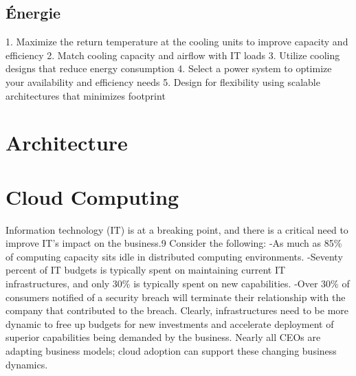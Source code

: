 \subsection{Énergie}
1. Maximize the return temperature at the cooling units to improve capacity and efficiency
2. Match cooling capacity and airflow with IT loads
3. Utilize cooling designs that reduce energy consumption
4. Select a power system to optimize your availability and efficiency needs
5. Design for flexibility using scalable architectures that minimizes footprint

\section{Architecture}

\section{Cloud Computing}

Information technology (IT) is at a breaking point, and there is a critical need to improve IT's impact on the business.9
Consider the following:
 -As much as 85\% of computing capacity sits idle in distributed computing environments.
 -Seventy percent of IT budgets is typically spent on maintaining current IT infrastructures, and only 30\% is typically spent on new capabilities.
 -Over 30\% of consumers notified of a security breach will terminate their relationship with the company that contributed to the breach.
Clearly, infrastructures need to be more dynamic to free up budgets for new investments and accelerate deployment of superior capabilities being demanded by the business. Nearly all CEOs are adapting business models; cloud adoption can support these changing business dynamics.

